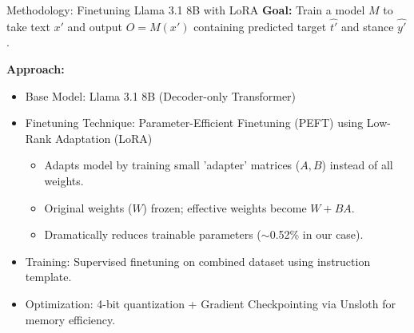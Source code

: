\documentclass{beamer}
\begin{document}
\begin{frame}{Methodology: Finetuning Llama 3.1 8B with LoRA}
  \textbf{Goal:} Train a model $M$ to take text $x'$ and output $O = M(x')$ containing predicted target $\hat{t'}$ and stance $\hat{y'}$.

  \medskip %

  \textbf{Approach:}
  \begin{itemize}
    \item Base Model: Llama 3.1 8B (Decoder-only Transformer)
    \item Finetuning Technique: Parameter-Efficient Finetuning (PEFT) using Low-Rank Adaptation (LoRA)
          \begin{itemize}
            \item Adapts model by training small 'adapter' matrices ($A, B$) instead of all weights.
            \item Original weights ($W$) frozen; effective weights become $W + BA$.
            \item Dramatically reduces trainable parameters ($\sim$0.52\% in our case).
          \end{itemize}
    \item Training: Supervised finetuning on combined dataset using instruction template.
    \item Optimization: 4-bit quantization + Gradient Checkpointing via Unsloth for memory efficiency.
  \end{itemize}
\end{frame}
\end{document}
